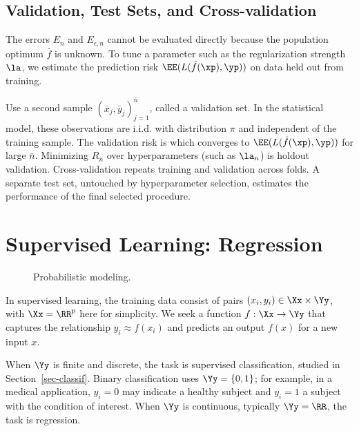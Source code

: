 \subsection{Validation, Test Sets, and Cross-validation}

The errors $E_n$ and $E_{\epsilon,n}$ cannot be evaluated directly because the population optimum $\bar f$ is unknown.
%
To tune a parameter such as the regularization strength $\la$, we estimate the prediction risk $\EE(L(\hat f(\xp),\yp))$ on data held out from training.

%
Use a second sample $(\bar x_j,\bar y_j)_{j=1}^{\bar n}$, called a validation set. In the statistical model, these observations are i.i.d. with distribution $\pi$ and independent of the training sample. The validation risk is
which converges to $\EE(L(\hat f(\xp),\yp))$ for large $\bar n$.
%
Minimizing $R_{\bar n}$ over hyperparameters (such as $\la_n$) is holdout validation. Cross-validation repeats training and validation across folds. A separate test set, untouched by hyperparameter selection, estimates the performance of the final selected procedure.


\section{Supervised Learning: Regression}
\label{sec-regression}

\begin{figure}[tbp]
\centering
{}
\caption{Probabilistic modeling.}
\label{fig-review-ml-joint-model}
\end{figure}
In supervised learning, the training data consist of pairs $(x_i,y_i)\in\Xx\times\Yy$, with $\Xx=\RR^p$ here for simplicity. We seek a function $f:\Xx\rightarrow\Yy$ that captures the relationship $y_i\approx f(x_i)$ and predicts an output $f(x)$ for a new input $x$.

When $\Yy$ is finite and discrete, the task is supervised classification, studied in Section~\ref{sec-classif}. Binary classification uses $\Yy=\{0,1\}$; for example, in a medical application, $y_i=0$ may indicate a healthy subject and $y_i=1$ a subject with the condition of interest.
%
When $\Yy$ is continuous, typically $\Yy=\RR$, the task is regression.


